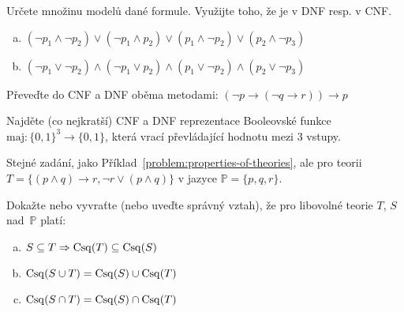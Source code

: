 \begin{problem} 
        
    Určete množinu modelů dané formule. Využijte toho, že je v DNF resp. v CNF.
    \begin{enumerate}[(a)]
        \item $(\neg p_1 \wedge \neg p_2)\vee( \neg p_1 \wedge p_2)\vee( p_1 \wedge \neg p_2)\vee( p_2 \wedge \neg p_3)$
        \item $(\neg p_1 \vee \neg p_2)\wedge( \neg p_1 \vee p_2)\wedge( p_1 \vee \neg p_2)\wedge( p_2 \vee \neg p_3)$
    \end{enumerate}

\end{problem}


\begin{problem} 
    
    Převeďte do CNF a DNF oběma metodami: $(\neg p \to (\neg q \to r))\to p$
    
\end{problem}


\begin{problem} 
    
    Najděte (co nejkratší) CNF a DNF reprezentace Booleovské funkce $\mathrm{maj}\colon\{0,1\}^3\to \{0,1\}$, která vrací převládající hodnotu mezi 3 vstupy.

\end{problem}


\begin{problem}
    
    Stejné zadání, jako Příklad~\ref{problem:properties-of-theories}, ale pro teorii $T=\{(p\wedge q)\to r, \neg r\vee(p\wedge q)\}$ v jazyce $\mathbb P=\{p,q,r\}$.
    
\end{problem}


\begin{problem}
    
    Dokažte nebo vyvraťte (nebo uveďte správný vztah), že pro libovolné teorie $T$, $S$ nad~$\mathbb{P}$ platí:
    \begin{enumerate}[(a)]
        \item $S\subseteq T \Rightarrow \operatorname{Csq}(T) \subseteq \operatorname{Csq}(S)$
        \item $\operatorname{Csq}(S\cup T)=\operatorname{Csq}(S) \cup \operatorname{Csq}(T)$
        \item $\operatorname{Csq}(S\cap T)=\operatorname{Csq}(S) \cap \operatorname{Csq}(T)$
    \end{enumerate}

\end{problem}


